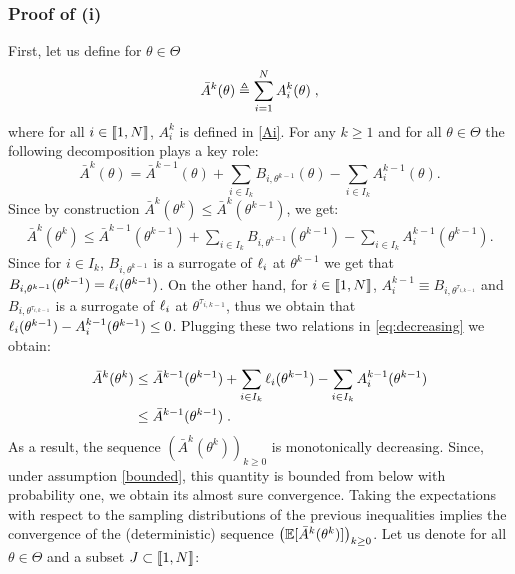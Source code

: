 \documentclass[11pt]{article}
\theoremstyle{plain}
\begin{document}
\subsubsection{Proof of (i)}
First, let us define for $\theta \in \Theta$
\begin{equation}\label{sumsurrogate}
 \bar{A}^k(\theta) \triangleq \sum_{i=1}^{N}{A^k_i(\theta)}\;,
\end{equation}
where for all $i \in \llbracket1,N\rrbracket$, $A^{k}_{i}$ is defined in \eqref{Ai}. For any $k \geq 1$ and for all $\theta \in \Theta$ the following decomposition plays a key role:
\begin{equation}\label{deterquantity}
\bar{A}^k(\theta) = \bar{A}^{k-1}(\theta) + \sum_{i \in I_{k}}^{}{B_{i,\theta^{k-1}}(\theta)} - \sum_{i \in I_{k}}^{}{A^{k-1}_{i}(\theta)}.
\end{equation}
Since by construction $\bar{A}^k(\theta^k) \leq  \bar{A}^k(\theta^{k-1})$, we get:
\begin{align}\label{eq:decreasing}
\bar{A}^k(\theta^k) \leq \bar{A}^{k-1}(\theta^{k-1}) + \sum_{i \in I_{k}}^{}{B_{i,\theta^{k-1}}(\theta^{k-1})} - \sum_{i \in I_{k}}^{}{A^{k-1}_{i}(\theta^{k-1})}.
\end{align}
Since for $i \in I_k$, $B_{i,\theta^{k-1}}$ is a surrogate of $\ell_i$ at $\theta^{k-1}$ we get that  $B_{i,\theta^{k-1}}(\theta^{k-1}) = \ell_{i}(\theta^{k-1})$. On the other hand, for $i \in \llbracket1,N\rrbracket$, $A^{k-1}_{i} \equiv B_{i,\theta^{\tau_{i,k-1}}}$ and $B_{i,\theta^{\tau_{i,k-1}}}$ is a surrogate of $\ell_i$ at $\theta^{\tau_{i,k-1}}$, thus we obtain that $ \ell_{i}(\theta^{k-1}) - A^{k-1}_{i}(\theta^{k-1}) \leq 0$. Plugging these two relations in \eqref{eq:decreasing}  we obtain:
\begin{align}
\bar{A}^k(\theta^k) & \leq \bar{A}^{k-1}(\theta^{k-1}) + \sum_{i \in I_{k}}^{}{\ell_{i}(\theta^{k-1})} - \sum_{i \in I_{k}}^{}{A^{k-1}_{i}(\theta^{k-1})}\\
& \leq \bar{A}^{k-1}(\theta^{k-1})\;.
\end{align}
As a result, the sequence $\left(\bar{A}^k(\theta^k)\right)_{k\geq0}$ is monotonically decreasing.  Since, under assumption \cref{bounded}, this quantity is bounded from below with probability one, we obtain its almost sure convergence. Taking the expectations with respect to the sampling distributions of the previous inequalities implies the convergence of the (deterministic) sequence $\left(\operatorname*{\mathbb{E}}[\bar{A}^k(\theta^k)]\right)_{k\geq0}$. Let us denote for all $\theta \in \Theta$ and a subset $J \subset \llbracket1,N\rrbracket$:
\end{document}
